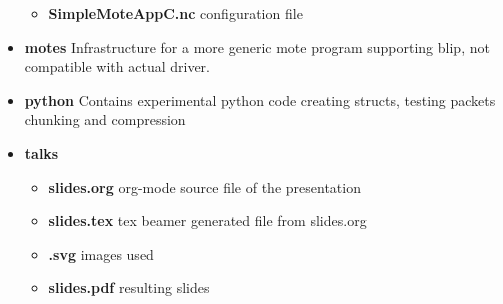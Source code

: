 \documentclass[11pt]{article}
\begin{document}
\begin{itemize}
\begin{itemize}
\item \textbf{SimpleMoteAppC.nc}
      configuration file
\end{itemize}

\item \textbf{motes}
    Infrastructure for a more generic mote program supporting blip, not compatible with actual driver.
\item \textbf{python}
    Contains experimental python code creating structs, testing packets chunking and compression
\item \textbf{talks}

\begin{itemize}
\item \textbf{slides.org}
      org-mode source file of the presentation
\item \textbf{slides.tex}
      tex beamer generated file from slides.org
\item \textbf{.svg}
      images used
\item \textbf{slides.pdf}
      resulting slides
\end{itemize}

\end{itemize}
\end{document}
